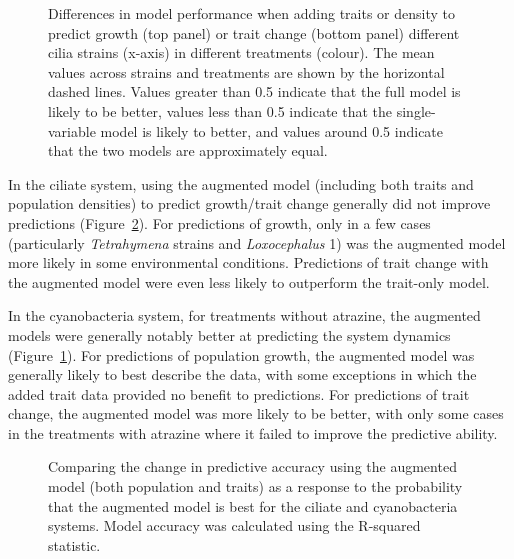 \documentclass[
  letterpaper,
  DIV=11,
  numbers=noendperiod]{scrartcl}
\begin{document}
\begin{figure}


\caption{\label{fig-AIC}Differences in model performance when adding
traits or density to predict growth (top panel) or trait change (bottom
panel) different cilia strains (x-axis) in different treatments
(colour). The mean values across strains and treatments are shown by the
horizontal dashed lines. Values greater than 0.5 indicate that the full
model is likely to be better, values less than 0.5 indicate that the
single-variable model is likely to better, and values around 0.5
indicate that the two models are approximately equal.}

\end{figure}%

In the ciliate system, using the augmented model (including both traits
and population densities) to predict growth/trait change generally did
not improve predictions (Figure~\ref{fig-AIC-deltaerror}). For
predictions of growth, only in a few cases (particularly
\emph{Tetrahymena} strains and \emph{Loxocephalus} 1) was the augmented
model more likely in some environmental conditions. Predictions of trait
change with the augmented model were even less likely to outperform the
trait-only model.

In the cyanobacteria system, for treatments without atrazine, the
augmented models were generally notably better at predicting the system
dynamics (Figure~\ref{fig-AIC}). For predictions of population growth,
the augmented model was generally likely to best describe the data, with
some exceptions in which the added trait data provided no benefit to
predictions. For predictions of trait change, the augmented model was
more likely to be better, with only some cases in the treatments with
atrazine where it failed to improve the predictive ability.

\begin{figure}


\caption{\label{fig-AIC-deltaerror}Comparing the change in predictive
accuracy using the augmented model (both population and traits) as a
response to the probability that the augmented model is best for the
ciliate and cyanobacteria systems. Model accuracy was calculated using
the R-squared statistic.}

\end{figure}%
\end{document}
